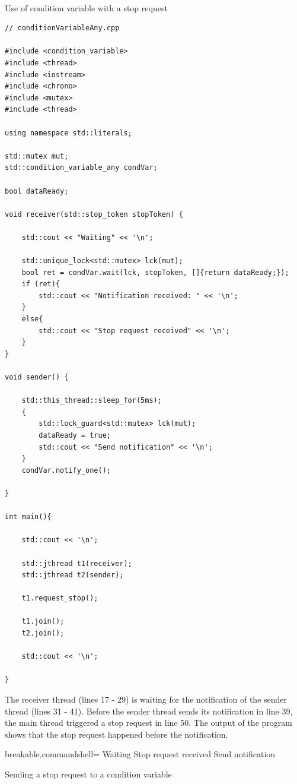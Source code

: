 \hspace*{\fill} \\ %
\noindent
Use of condition variable with a stop request
\begin{lstlisting}[style=styleCXX]
// conditionVariableAny.cpp

#include <condition_variable>
#include <thread>
#include <iostream>
#include <chrono>
#include <mutex>
#include <thread>

using namespace std::literals;

std::mutex mut;
std::condition_variable_any condVar;

bool dataReady;

void receiver(std::stop_token stopToken) {

	std::cout << "Waiting" << '\n';
	
	std::unique_lock<std::mutex> lck(mut);
	bool ret = condVar.wait(lck, stopToken, []{return dataReady;});
	if (ret){
		std::cout << "Notification received: " << '\n';
	}
	else{
		std::cout << "Stop request received" << '\n';
	}
}

void sender() {

	std::this_thread::sleep_for(5ms);
	{
		std::lock_guard<std::mutex> lck(mut);
		dataReady = true;
		std::cout << "Send notification" << '\n';
	}
	condVar.notify_one();

}

int main(){

	std::cout << '\n';
	
	std::jthread t1(receiver);
	std::jthread t2(sender);
	
	t1.request_stop();
	
	t1.join();
	t2.join();
	
	std::cout << '\n';

}
\end{lstlisting}

The receiver thread (lines 17 - 29) is waiting for the notification of the sender thread (lines 31 - 41). Before the sender thread sends its notification in line 39, the main thread triggered a stop request in line 50. The output of the program shows that the stop request happened before the notification.

\begin{tcblisting}{breakable,commandshell={}}
Waiting
Stop request received
Send notification
\end{tcblisting}

\begin{center}
Sending a stop request to a condition variable
\end{center}

